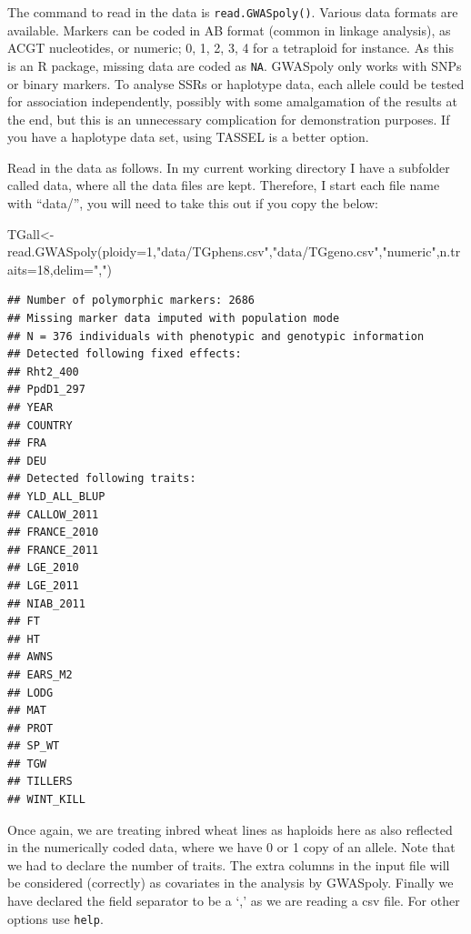 \documentclass[
]{book}
\newenvironment{Shaded}{\begin{snugshade}}{\end{snugshade}}
\newcommand{\AttributeTok}[1]{\textcolor[rgb]{0.77,0.63,0.00}{#1}}
\newcommand{\DecValTok}[1]{\textcolor[rgb]{0.00,0.00,0.81}{#1}}
\newcommand{\FunctionTok}[1]{\textcolor[rgb]{0.00,0.00,0.00}{#1}}
\newcommand{\NormalTok}[1]{#1}
\newcommand{\OtherTok}[1]{\textcolor[rgb]{0.56,0.35,0.01}{#1}}
\newcommand{\StringTok}[1]{\textcolor[rgb]{0.31,0.60,0.02}{#1}}
\begin{document}
The command to read in the data is \texttt{read.GWASpoly()}. Various data formats are available. Markers can be coded in AB format (common in linkage analysis), as ACGT nucleotides, or numeric; 0, 1, 2, 3, 4 for a tetraploid for instance. As this is an R package, missing data are coded as \texttt{NA}. GWASpoly only works with SNPs or binary markers. To analyse SSRs or haplotype data, each allele could be tested for association independently, possibly with some amalgamation of the results at the end, but this is an unnecessary complication for demonstration purposes. If you have a haplotype data set, using TASSEL is a better option.

Read in the data as follows. In my current working directory I have a subfolder called data, where all the data files are kept. Therefore, I start each file name with ``data/'', you will need to take this out if you copy the below:

\begin{Shaded}
\begin{Highlighting}[]
\NormalTok{TGall}\OtherTok{\textless{}{-}}\FunctionTok{read.GWASpoly}\NormalTok{(}\AttributeTok{ploidy=}\DecValTok{1}\NormalTok{,}\StringTok{"data/TGphens.csv"}\NormalTok{,}\StringTok{"data/TGgeno.csv"}\NormalTok{,}\StringTok{"numeric"}\NormalTok{,}\AttributeTok{n.traits=}\DecValTok{18}\NormalTok{,}\AttributeTok{delim=}\StringTok{","}\NormalTok{)}
\end{Highlighting}
\end{Shaded}

\begin{verbatim}
## Number of polymorphic markers: 2686 
## Missing marker data imputed with population mode 
## N = 376 individuals with phenotypic and genotypic information 
## Detected following fixed effects:
## Rht2_400
## PpdD1_297
## YEAR
## COUNTRY
## FRA
## DEU
## Detected following traits:
## YLD_ALL_BLUP
## CALLOW_2011
## FRANCE_2010
## FRANCE_2011
## LGE_2010
## LGE_2011
## NIAB_2011
## FT
## HT
## AWNS
## EARS_M2
## LODG
## MAT
## PROT
## SP_WT
## TGW
## TILLERS
## WINT_KILL
\end{verbatim}

Once again, we are treating inbred wheat lines as haploids here as also reflected in the numerically coded data, where we have 0 or 1 copy of an allele. Note that we had to declare the number of traits. The extra columns in the input file will be considered (correctly) as covariates in the analysis by GWASpoly. Finally we have declared the field separator to be a `,' as we are reading a csv file. For other options use \texttt{help}.
\end{document}
